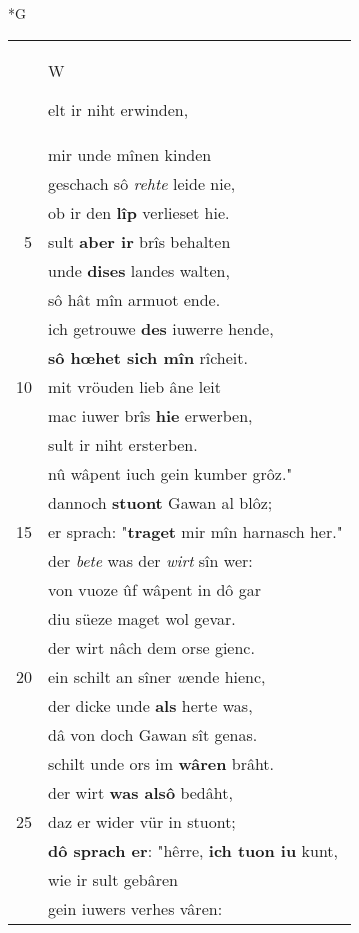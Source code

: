 \documentclass[8pt,a4paper,notitlepage]{article}
\begin{document}
\begin{table}[ht]
\begin{minipage}[t]{0.5\linewidth}
\small
\begin{center}*G
\end{center}
\begin{tabular}{rl}
 & \begin{large}W\end{large}elt ir niht erwinden,\\ 
 & mir unde mînen kinden\\ 
 & geschach sô \textit{rehte} leide nie,\\ 
 & ob ir den \textbf{lîp} verlieset hie.\\ 
5 & sult \textbf{aber ir} brîs behalten\\ 
 & unde \textbf{dises} landes walten,\\ 
 & sô hât mîn armuot ende.\\ 
 & ich getrouwe \textbf{des} iuwerre hende,\\ 
 & \textbf{sô hœhet sich mîn} rîcheit.\\ 
10 & mit vröuden lieb âne leit\\ 
 & mac iuwer brîs \textbf{hie} erwerben,\\ 
 & sult ir niht ersterben.\\ 
 & nû wâpent iuch gein kumber grôz."\\ 
 & dannoch \textbf{stuont} Gawan al blôz;\\ 
15 & er sprach: "\textbf{traget} mir mîn harnasch her."\\ 
 & der \textit{bete} was der \textit{wirt} sîn wer:\\ 
 & von vuoze ûf wâpent in dô gar\\ 
 & diu süeze maget wol gevar.\\ 
 & der wirt nâch dem orse gienc.\\ 
20 & ein schilt an sîner \textit{w}ende hienc,\\ 
 & der dicke unde \textbf{als} herte was,\\ 
 & dâ von doch Gawan sît genas.\\ 
 & schilt unde ors im \textbf{wâren} brâht.\\ 
 & der wirt \textbf{was alsô} bedâht,\\ 
25 & daz er wider vür in stuont;\\ 
 & \textbf{dô sprach er}: "hêrre, \textbf{ich tuon iu} kunt,\\ 
 & wie ir sult gebâren\\ 
 & gein iuwers verhes vâren:\\ 

\end{tabular}
\end{minipage}
\end{table}
\end{document}
